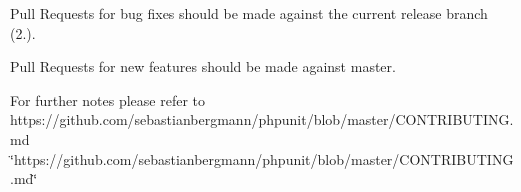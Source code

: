 Pull Requests for bug fixes should be made against the current release branch (2.).

Pull Requests for new features should be made against master.

For further notes please refer to https\+://github.com/sebastianbergmann/phpunit/blob/master/\+C\+O\+N\+T\+R\+I\+B\+U\+T\+I\+N\+G.\+md \char`\"{}https\+://github.\+com/sebastianbergmann/phpunit/blob/master/\+C\+O\+N\+T\+R\+I\+B\+U\+T\+I\+N\+G.\+md\char`\"{} 